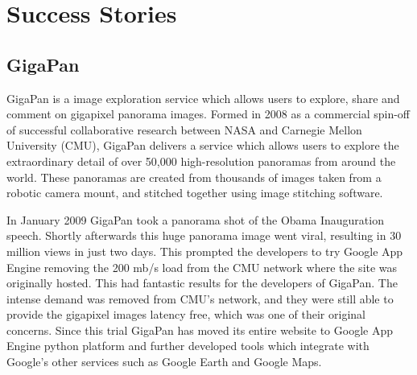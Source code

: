 \chapter{Success Stories}
\section{GigaPan}
GigaPan is a image exploration service which allows users to explore, share and comment on gigapixel panorama images. Formed in 2008 as a commercial spin-off of successful collaborative research between NASA and Carnegie Mellon University (CMU), GigaPan delivers a service which allows users to explore the extraordinary detail of over 50,000 high-resolution panoramas from around the world. These panoramas are created from thousands of images taken from a robotic camera mount, and stitched together using image stitching software.

In January 2009 GigaPan took a panorama shot of the Obama Inauguration speech. Shortly afterwards this huge panorama image went viral, resulting in 30 million views in just two days. This prompted the developers to try Google App Engine removing the 200 mb/s load from the CMU network where the site was originally hosted. This had fantastic results for the developers of GigaPan. The intense demand was removed from CMU's network, and they were still able to provide the gigapixel images latency free, which was one of their original concerns. Since this trial GigaPan has moved its entire website to Google App Engine python platform and further developed tools which integrate with Google's other services such as Google Earth and Google Maps.


